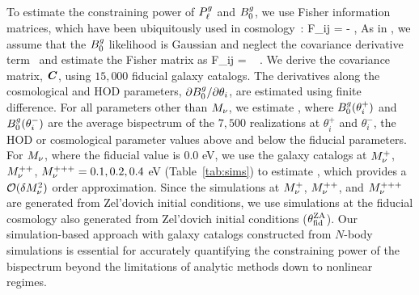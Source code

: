 To estimate the constraining power of $P^g_{\ell}$ and $B^g_0$, we use Fisher information
matrices, which have been ubiquitously used in
cosmology~\citep[\emph{e.g.}][]{jungman1996,tegmark1997,dodelson2003,heavens2009,verde2010}: 
\beq 
F_{ij} = - \bigg \langle {} \bigg \rangle,
\eeq
As in \cite{hahn2020}, we assume that the $B^g_0$ likelihood is Gaussian and
neglect the covariance derivative term~\citep{carron2013} and estimate the
Fisher matrix as 
\beq \label{eq:fisher}
F_{ij} = ~ .
\eeq
We derive the covariance matrix, $\textbf{\textit{C}}$, using $15,000$ fiducial galaxy
catalogs. The derivatives along the cosmological and HOD
parameters, $\partial B^g_0/\partial \theta_i$, are estimated using finite
difference. For all parameters other than $M_\nu$, we estimate 
\beq 
{} \approx {}, 
\eeq
where $B^g_0(\theta_i^{+})$ and $B^g_0(\theta_i^{-})$ are the average bispectrum of the 
$7,500$ realizations at $\theta_i^{+}$ and $\theta_i^{-}$, the HOD or 
cosmological parameter values above and below the fiducial parameters.  
For $M_\nu$, where the fiducial value is 0.0 eV, we use the galaxy catalogs 
at $M_\nu^+$, $M_\nu^{++}$, $M_\nu^{+++}=0.1, 0.2, 0.4$ eV (Table~\ref{tab:sims}) 
to estimate 
\beq \label{eq:dbkdmnu} 
\frac{\partial \Bg}{\partial \smnu} \approx {}, 
\eeq
which provides a $\mathcal{O}(\delta M_\nu^2)$ order approximation. 
Since the simulations at $M_\nu^+$, $M_\nu^{++}$, and $M_\nu^{+++}$ are generated 
from Zel'dovich initial conditions, we use simulations at the fiducial cosmology 
also generated from Zel'dovich initial conditions ($\theta_{\rm fid}^{\rm ZA}$). 
Our simulation-based approach with galaxy catalogs constructed from
$N$-body simulations is essential for accurately quantifying the constraining power
of the bispectrum beyond the limitations of analytic methods down to nonlinear
regimes.
